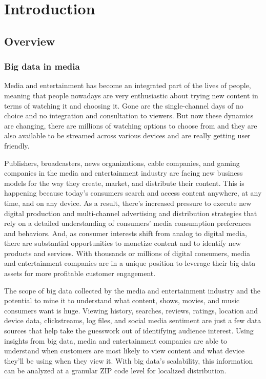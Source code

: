\chapter{Introduction}
\section{Overview}
\subsection{Big data in media}
Media and entertainment has become an integrated part of the lives of people, meaning that people nowadays are very enthusiastic about trying new content in terms of watching it and choosing it. Gone are the single-channel days of no choice and no integration and consultation to viewers. But now these dynamics are changing, there are millions of watching options to choose from and they are also available to be streamed across various devices and are really getting user friendly.\newline

Publishers, broadcasters, news organizations, cable companies, and gaming companies in the media and entertainment industry are facing new business models for the way they create, market, and distribute their content. This is happening because today’s consumers search and access content anywhere, at any time, and on any device. As a result, there’s increased pressure to execute new digital production and multi-channel advertising and distribution strategies that rely on a detailed understanding of consumers’ media consumption preferences and behaviors. And, as consumer interests shift from analog to digital media, there are substantial opportunities to monetize content and to identify new products and services. With thousands or millions of digital consumers, media and entertainment companies are in a unique position to leverage their big data assets for more profitable customer engagement. \newline

The scope of big data collected by the media and entertainment industry and the potential to mine it to understand what content, shows, movies, and music consumers want is huge. Viewing history, searches, reviews, ratings, location and device data, clickstreams, log files, and social media sentiment are just a few data sources that help take the guesswork out of identifying audience interest. Using insights from big data, media and entertainment companies are able to understand when customers are most likely to view content and what device they’ll be using when they view it. With big data’s scalability, this information can be analyzed at a granular ZIP code level for localized distribution.

